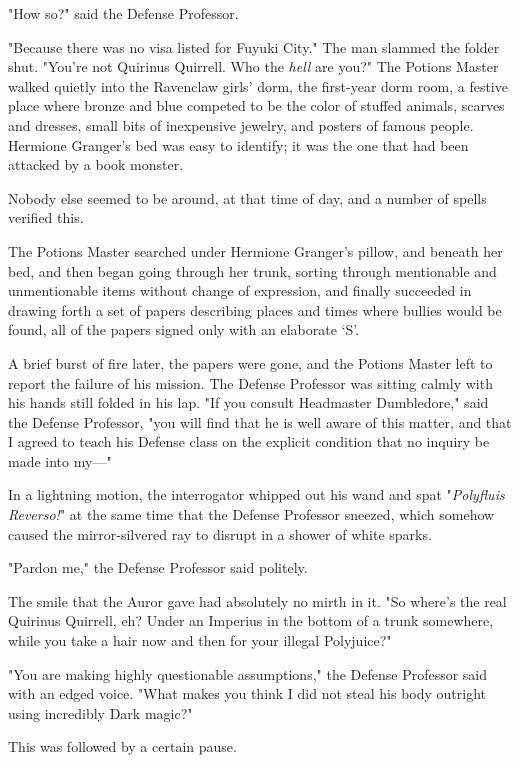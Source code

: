 "How so?" said the Defense Professor.

"Because there was no visa listed for Fuyuki City." The man slammed the folder 
shut. "You're not Quirinus Quirrell. Who the \emph{hell} are you?"
\sbreak
The Potions Master walked quietly into the Ravenclaw girls' dorm, the 
first-year dorm room, a festive place where bronze and blue competed to be the 
color of stuffed animals, scarves and dresses, small bits of inexpensive 
jewelry, and posters of famous people. Hermione Granger's bed was easy to 
identify; it was the one that had been attacked by a book monster.

Nobody else seemed to be around, at that time of day, and a number of spells 
verified this.

The Potions Master searched under Hermione Granger's pillow, and beneath her 
bed, and then began going through her trunk, sorting through mentionable and 
unmentionable items without change of expression, and finally succeeded in 
drawing forth a set of papers describing places and times where bullies would 
be found, all of the papers signed only with an elaborate `S'.

A brief burst of fire later, the papers were gone, and the Potions Master left 
to report the failure of his mission.
\sbreak
The Defense Professor was sitting calmly with his hands still folded in his 
lap. "If you consult Headmaster Dumbledore," said the Defense Professor, "you 
will find that he is well aware of this matter, and that I agreed to teach his 
Defense class on the explicit condition that no inquiry be made into my---"

In a lightning motion, the interrogator whipped out his wand and spat 
"\emph{Polyfluis Reverso!}" at the same time that the Defense Professor 
sneezed, which somehow caused the mirror-silvered ray to disrupt in a shower of 
white sparks.

"Pardon me," the Defense Professor said politely.

The smile that the Auror gave had absolutely no mirth in it. "So where's the 
real Quirinus Quirrell, eh? Under an Imperius in the bottom of a trunk 
somewhere, while you take a hair now and then for your illegal Polyjuice?"

"You are making highly questionable assumptions," the Defense Professor said 
with an edged voice. "What makes you think I did not steal his body outright 
using incredibly Dark magic?"

This was followed by a certain pause.

